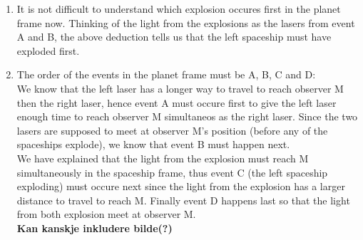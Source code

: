 \documentclass[a4paper,10pt,english]{article}
\begin{document}
\begin{enumerate}
\item It is not difficult to understand which explosion occures first in the planet frame now. Thinking of the light from the explosions as the lasers from event A and B, the above deduction tells us that the left spaceship must have exploded first.

\item The order of the events in the planet frame must be A, B, C and D:
\\
We know that the left laser has a longer way to travel to reach observer M then the right laser, hence event A must occure first to give the left laser enough time to reach observer M simultaneos as the right laser. Since the two lasers are supposed to meet at observer M's position (before any of the spaceships explode), we know that event B must happen next.
\\
We have explained that the light from the explosion must reach M simultaneously in the spaceship frame, thus event C (the left spaceship exploding) must occure next since the light from the explosion has a larger distance to travel to reach M. Finally event D happens last so that the light from both explosion meet at observer M.
\\
\textbf{Kan kanskje inkludere bilde(?)}
\end{enumerate}
\end{document}
